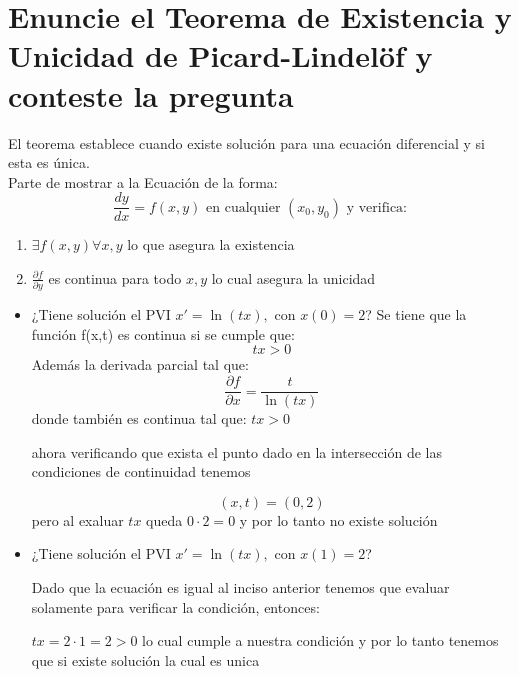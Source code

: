 \section{Enuncie el Teorema de Existencia y Unicidad de Picard-Lindelöf y conteste la pregunta}
El teorema establece cuando existe solución para una ecuación diferencial y si esta es única.\\
Parte de mostrar a la Ecuación de la forma:\\
$$\frac{dy}{dx}=f(x,y) \mbox{ en cualquier }(x_0,y_0) \mbox{ y verifica:}$$
\begin{enumerate}
    \item $ \exists f(x,y) \forall x,y$ lo que asegura la existencia
    \item $\frac{\partial f}{\partial y}$ es continua para todo $x, y$ lo cual asegura la unicidad
\end{enumerate}

\begin{itemize}
    \item ¿Tiene solución el PVI $x'= \ln(tx),\mbox{ con } x(0) = 2$?
            Se tiene que la función f(x,t) es continua si se cumple que:
            $$tx>0$$
            Además la derivada parcial tal que:
            $$\frac{\partial f}{\partial x}=\frac{t}{\ln(tx)}$$
            donde también es continua tal que: $tx>0$
            
            ahora verificando que exista el punto dado en la intersección de las condiciones de continuidad tenemos
            
            $$(x,t)=(0,2)$$
            pero al exaluar $tx$ queda $0\cdot 2=0$ y por lo tanto no existe solución
                    
    \item ¿Tiene solución el PVI $x'= \ln(tx), \mbox{ con } x(1) = 2$?
            
            Dado que la ecuación es igual al inciso anterior tenemos que evaluar solamente para verificar la condición, entonces:
            
            $tx=2\cdot 1=2>0$ lo cual cumple a nuestra condición y por lo tanto tenemos que si existe solución la cual es unica
            
\end{itemize}